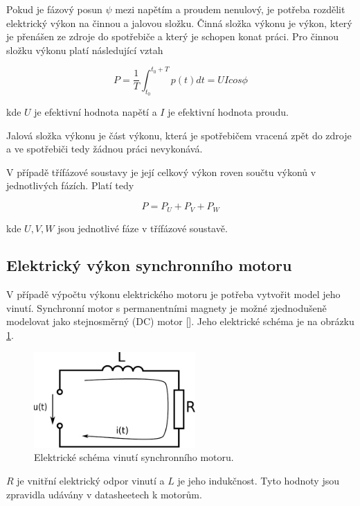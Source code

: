 Pokud je fázový posun $\psi$ mezi napětím a proudem nenulový, je potřeba rozdělit elektrický výkon na činnou a jalovou složku. Činná složka výkonu je výkon, který je přenášen ze zdroje do spotřebiče a který je schopen konat práci. Pro činnou složku výkonu platí následující vztah

\begin{equation}
P = \frac{1}{T} \int_{t_0}^{t_0 + T} p(t)dt = UI cos\phi
\label{act_power_eq}
\end{equation}  

kde $U$ je efektivní hodnota napětí a $I$ je efektivní hodnota proudu.

Jalová složka výkonu je část výkonu, která je spotřebičem vracená zpět do zdroje a ve spotřebiči tedy žádnou práci nevykonává.

V případě třífázové soustavy je její celkový výkon roven součtu výkonů v jednotlivých fázích. Platí tedy

\begin{equation}
P = P_U + P_V + P_W
\label{3ph_power_eq}
\end{equation}  

kde $U,V,W$ jsou jednotlivé fáze v třífázové soustavě.

\subsection{Elektrický výkon synchronního motoru}

V případě výpočtu výkonu elektrického motoru je potřeba vytvořit model jeho vinutí. Synchronní motor s permanentními magnety je možné zjednodušeně modelovat jako stejnosměrný (DC) motor [\cite{sbornik}]. Jeho elektrické schéma je na obrázku \ref{schema_motoru_pic}.  

\begin{figure}[ht]
\includegraphics[width=0.55\textwidth]{obvod_motoru}
\caption{Elektrické schéma vinutí synchronního motoru.}
\label{schema_motoru_pic}
\end{figure}

$R$ je vnitřní elektrický odpor vinutí a $L$ je jeho indukčnost. Tyto hodnoty jsou zpravidla udávány v datasheetech k motorům.

